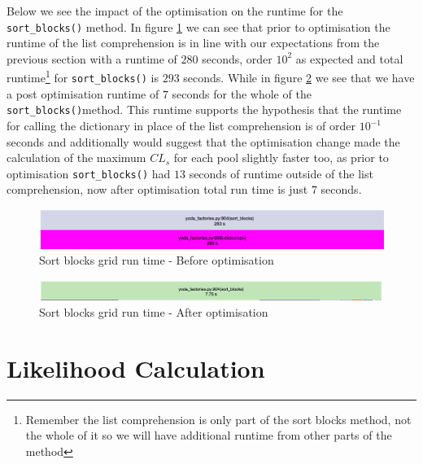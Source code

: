 Below we see the impact of the optimisation on the runtime for the \texttt{sort\_blocks()} method. In figure \ref{fig:sort_blocks_before} we can see that prior to optimisation the runtime of the list comprehension is in line with our expectations from the previous section with a runtime of $280$ seconds, order $10^2$ as expected and total runtime\footnote{Remember the list comprehension is only part of the sort blocks method, not the whole of it so we will have additional runtime from other parts of the method} for \texttt{sort\_blocks()} is $293$ seconds. While in figure \ref{fig:sort_blocks_after} we see that we have a post optimisation runtime of $7$ seconds for the whole of the \texttt{sort\_blocks()}method. This runtime supports the hypothesis that the runtime for calling the dictionary in place of the list comprehension is of order $10^{-1}$ seconds and additionally would suggest that the optimisation change made the calculation of the maximum $CL_s$  for each pool slightly faster too, as prior to optimisation \texttt{sort\_blocks()} had $13$ seconds of runtime outside of the list comprehension, now after optimisation total run time is just $7$ seconds. 

\begin{figure}[H]
\centering
\includegraphics[scale=0.3]{plots/sort_blocks_before.png}
\caption{Sort blocks grid run time - Before optimisation}
\label{fig:sort_blocks_before}
\end{figure}



\begin{figure}[H]
\centering
\includegraphics[scale=0.3]{plots/sort_blocks_after.png}
\caption{Sort blocks grid run time - After optimisation}
\label{fig:sort_blocks_after}
\end{figure}



\section{Likelihood Calculation}\label{sec:likelihood}
